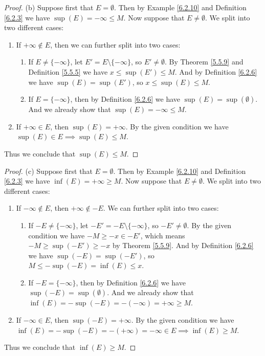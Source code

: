 \begin{proof}{(b)}
Suppose first that \(E = \emptyset\).
Then by Example \ref{6.2.10} and Definition \ref{6.2.3} we have \(\sup(E) = -\infty \leq M\).
Now suppose that \(E \neq \emptyset\).
We split into two different cases:
\begin{enumerate}[label=(\Roman*)]
    \item If \(+\infty \not\in E\), then we can further split into two cases:
    \begin{enumerate}[label=(\roman*)]
        \item If \(E \neq \{-\infty\}\), let \(E' = E \setminus \{-\infty\}\), so \(E' \neq \emptyset\).
        By Theorem \ref{5.5.9} and Definition \ref{5.5.5} we have \(x \leq \sup(E') \leq M\).
        And by Definition \ref{6.2.6} we have \(\sup(E) = \sup(E')\), so \(x \leq \sup(E) \leq M\).
        \item If \(E = \{-\infty\}\), then by Definition \ref{6.2.6} we have \(\sup(E) = \sup(\emptyset)\).
        And we already show that \(\sup(E) = -\infty \leq M\).
    \end{enumerate}
    \item If \(+\infty \in E\), then \(\sup(E) = +\infty\).
    By the given condition we have \(\sup(E) \in E \implies \sup(E) \leq M\).
\end{enumerate}
Thus we conclude that \(\sup(E) \leq M\).
\end{proof}

\begin{proof}{(c)}
Suppose first that \(E = \emptyset\).
Then by Example \ref{6.2.10} and Definition \ref{6.2.3} we have \(\inf(E) = +\infty \geq M\).
Now suppose that \(E \neq \emptyset\).
We split into two different cases:
\begin{enumerate}[label=(\Roman*)]
    \item If \(-\infty \not\in E\), then \(+\infty \not\in -E\).
    We can further split into two cases:
    \begin{enumerate}[label=(\roman*)]
        \item If \(-E \neq \{-\infty\}\), let \(-E' = -E \setminus \{-\infty\}\), so \(-E' \neq \emptyset\).
        By the given condition we have \(-M \geq -x \in -E'\), which means \(-M \geq \sup(-E') \geq -x\) by Theorem \ref{5.5.9}.
        And by Definition \ref{6.2.6} we have \(\sup(-E) = \sup(-E')\), so \(M \leq -\sup(-E) = \inf(E) \leq x\).
        \item If \(-E = \{-\infty\}\), then by Definition \ref{6.2.6} we have \(\sup(-E) = \sup(\emptyset)\).
        And we already show that \(\inf(E) = -\sup(-E) = -(-\infty) = +\infty \geq M\).
    \end{enumerate}
    \item If \(-\infty \in E\), then \(\sup(-E) = +\infty\).
    By the given condition we have \(\inf(E) = -\sup(-E) = -(+\infty) = -\infty \in E \implies \inf(E) \geq M\).
\end{enumerate}
Thus we conclude that \(\inf(E) \geq M\).
\end{proof}

